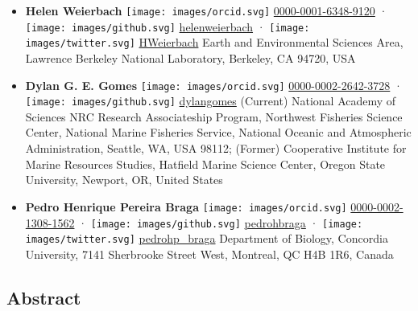 \begin{itemize}
\item
  \textbf{Helen Weierbach}
  \texttt{[image: images/orcid.svg]}
  \href{https://orcid.org/0000-0001-6348-9120}{0000-0001-6348-9120}
  · \texttt{[image: images/github.svg]}
  \href{https://github.com/helenweierbach}{helenweierbach}
  · \texttt{[image: images/twitter.svg]}
  \href{https://twitter.com/HWeierbach}{HWeierbach}
  Earth and Environmental Sciences Area, Lawrence Berkeley National Laboratory, Berkeley, CA 94720, USA
\item
  \textbf{Dylan G. E. Gomes}
  \texttt{[image: images/orcid.svg]}
  \href{https://orcid.org/0000-0002-2642-3728}{0000-0002-2642-3728}
  · \texttt{[image: images/github.svg]}
  \href{https://github.com/dylangomes}{dylangomes}
  (Current) National Academy of Sciences NRC Research Associateship Program, Northwest Fisheries Science Center, National Marine Fisheries Service, National Oceanic and Atmospheric Administration, Seattle, WA, USA 98112; (Former) Cooperative Institute for Marine Resources Studies, Hatfield Marine Science Center, Oregon State University, Newport, OR, United States
\item
  \textbf{Pedro Henrique Pereira Braga}
  \texttt{[image: images/orcid.svg]}
  \href{https://orcid.org/0000-0002-1308-1562}{0000-0002-1308-1562}
  · \texttt{[image: images/github.svg]}
  \href{https://github.com/pedrohbraga}{pedrohbraga}
  · \texttt{[image: images/twitter.svg]}
  \href{https://twitter.com/pedrohp_braga}{pedrohp\_braga}
  Department of Biology, Concordia University, 7141 Sherbrooke Street West, Montreal, QC H4B 1R6, Canada
\end{itemize}

\hypertarget{abstract}{%
\subsection{Abstract}\label{abstract}}

